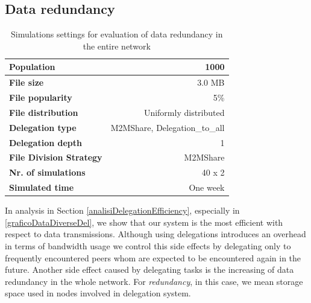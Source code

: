 \subsection{Data redundancy}
\begin{table}[h]
\begin{center}
\begin{tabular}{|l|r|}
\hline
\bfseries Population & 1000 \\
\hline
\bfseries File size & 3.0 MB \\
\hline
\bfseries File popularity & 5\% \\
\hline
\bfseries File distribution & Uniformly distributed \\
\hline
\bfseries Delegation type & M2MShare, Delegation\_to\_all \\
\hline
\bfseries Delegation depth & 1 \\
\hline
\bfseries File Division Strategy & M2MShare \\
\hline
\bfseries Nr. of simulations & 40 x 2\\
\hline
\bfseries Simulated time & One week \\
\hline
\end{tabular}
\end{center}
\caption{Simulations settings for evaluation of data redundancy in the entire network\label{tab:settingsRedundancy}}
\end{table}

In analysis in Section \ref{analisiDelegationEfficiency}, especially in \figurename~ \ref{graficoDataDiverseDel}, we show that our system is the most efficient with respect to data transmissions. Although using delegations introduces an overhead in terms of bandwidth usage we control this side effects by delegating only to frequently encountered peers whom are expected to be encountered again in the future. Another side effect caused by delegating tasks is the increasing of data redundancy in the whole network. For \textit{redundancy}, in this case, we mean storage space used in nodes involved in delegation system. 
\\ 

